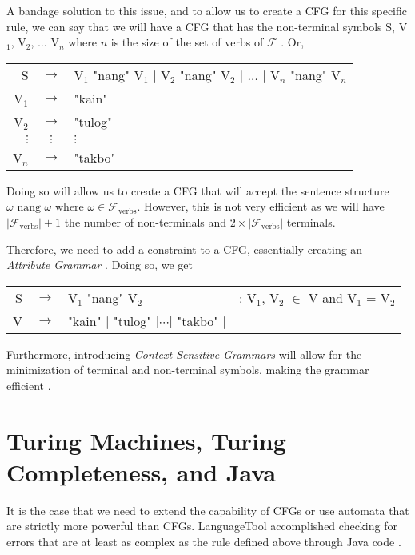 A bandage solution to this issue, and to allow us to create a CFG for this specific rule, we can say that we will have a CFG that has the non-terminal symbols S, V$_1$, V$_2$, $\dots$ V$_n$ where $n$ is the size of the set of verbs of $\mathcal{F}$ \cite{Seki_Matsumura_Fujii_Kasami_1991}. Or,

\begin{center}
    \begin{tabular}{rcl}
         S & $\to$ & V$_1$ "nang" V$_1$ $|$ V$_2$ "nang" V$_2$ $|$ $\dots$ $|$ V$_n$ "nang" V$_n$  \\
         V$_1$ & $\to$ & "kain" \\
         V$_2$ & $\to$ & "tulog" \\
         $\vdots$ & $\vdots$ & $\vdots$ \\
         V$_n$ & $\to$ & "takbo"
    \end{tabular}
\end{center}

Doing so will allow us to create a CFG that will accept the sentence structure $\omega \text{ nang } \omega$ where $\omega \in \mathcal{F}_\text{verbs}$. However, this is not very efficient as we will have $|\mathcal{F}_\text{verbs}| + 1$ the number of non-terminals and $2\times|\mathcal{F}_\text{verbs}|$ terminals.

Therefore, we need to add a constraint to a CFG, essentially creating an \textit{Attribute Grammar} \cite{kalita_kumar_roy_2022}. Doing so, we get

\begin{center}
    \begin{tabular}{rcll}
         S &$\to$& V$_1$ "nang" V$_2$ & : V$_1$, V$_2$ $\in$ V and V$_1$ = V$_2$  \\
         V &$\to$& "kain" $|$ "tulog" $| \cdots |$ "takbo" $|$ &
    \end{tabular}
\end{center}

Furthermore, introducing \textit{Context-Sensitive Grammars} will allow for the minimization of terminal and non-terminal symbols, making the grammar efficient \cite{Stabler_2004, Rawski_Dolatian_Heinz_Raimy_2023}. 

\section{Turing Machines, Turing Completeness, and Java}

It is the case that we need to extend the capability of CFGs or use automata that are strictly more powerful than CFGs. LanguageTool accomplished checking for errors that are at least as complex as the rule defined above through Java code \cite{LanguageToolDevDocs}.

